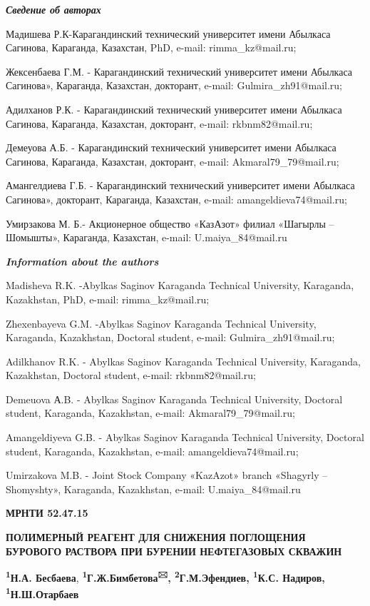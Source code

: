 \emph{{\bfseries Сведение об авторах}}

Мадишева Р.К-Карагандинский технический университет имени Абылкаса
Сагинова, Караганда, Казахстан, PhD, e-mail: rimma\_kz@mail.ru;

Жексенбаева Г.М. - Карагандинский технический университет имени Абылкаса
Сагинова», Караганда, Казахстан, докторант, e-mail:
Gulmira\_zh91@mail.ru;

Адилханов Р.К. - Карагандинский технический университет имени Абылкаса
Сагинова, Караганда, Казахстан, докторант, e-mail: rkbnm82@mail.ru;

Демеуова А.Б. - Карагандинский технический университет имени Абылкаса
Сагинова, Караганда, Казахстан, докторант, e-mail:
Akmaral79\_79@mail.ru;

Амангелдиева Г.Б. - Карагандинский технический университет имени
Абылкаса Сагинова», докторант, Караганда, Казахстан, e-mail:
amangeldieva74@mail.ru;

Умирзакова М. Б.- Акционерное общество «КазАзот» филиал «Шагырлы --
Шомышты», Караганда, Казахстан, e-mail: U.maiya\_84@mail.ru

\emph{{\bfseries Information about the authors}}

Madisheva R.K. -Abylkas Saginov Karaganda Technical University,
Karaganda, Kazakhstan, PhD, e-mail: rimma\_kz@mail.ru;

Zhexenbayeva G.M. -Abylkas Saginov Karaganda Technical University,
Karaganda, Kazakhstan, Doctoral student, e-mail: Gulmira\_zh91@mail.ru;

Adilkhanov R.K. - Abylkas Saginov Karaganda Technical University,
Karaganda, Kazakhstan, Doctoral student, e-mail: rkbnm82@mail.ru;

Demeuova А.B. - Abylkas Saginov Karaganda Technical University, Doctoral
student, Karaganda, Kazakhstan, e-mail: Akmaral79\_79@mail.ru;

Amangeldiyeva G.B. - Abylkas Saginov Karaganda Technical University,
Doctoral student, Karaganda, Kazakhstan, e-mail: amangeldieva74@mail.ru;

Umirzakova M.B. - Joint Stock Company «KazAzot» branch «Shagyrly --
Shomyshty», Karaganda, Kazakhstan, e-mail: U.maiya\_84@mail.ru

{\bfseries \hfill\break
}\newpage
{\bfseries МРНТИ 52.47.15}

{\bfseries ПОЛИМЕРНЫЙ РЕАГЕНТ ДЛЯ СНИЖЕНИЯ ПОГЛОЩЕНИЯ БУРОВОГО РАСТВОРА ПРИ
БУРЕНИИ НЕФТЕГАЗОВЫХ СКВАЖИН}

{\bfseries \textsuperscript{1}Н.А. Бесбаева},
{\bfseries \textsuperscript{1}Г.Ж.Бимбетова\textsuperscript{🖂},
\textsuperscript{2}Г.М.Эфендиев, \textsuperscript{1}К.С. Надиров,
\textsuperscript{1}Н.Ш.Отарбаев}

